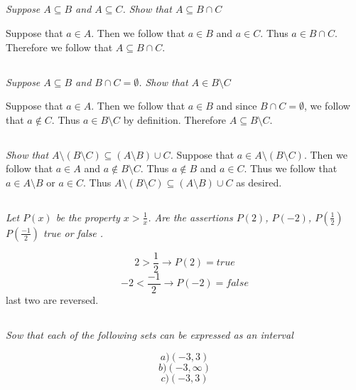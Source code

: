\documentclass[11pt,oneside,titlepage]{book}
\begin{document}
\subsection{}

\textit{Suppose $A \subseteq B$ and $A \subseteq C$. Show that $A \subseteq B \cap C$}

Suppose that $a \in A$. Then we follow that $a \in B$ and $a \in C$. Thus $a \in B \cap C$.
Therefore we follow that $A \subseteq B \cap C$.

\subsection{}

\textit{Suppose $A \subseteq B$ and $B \cap C = \emptyset$. Show that $A \in B \setminus C$}

Suppose that $a \in A$. Then we follow that $a \in B$ and since $B \cap C = \emptyset$, we
follow that $a \notin C$. Thus $a \in B \setminus C$ by definition. Therefore
$A \subseteq B \setminus C$.

\subsection{}

\textit{Show that $A \setminus (B \setminus C) \subseteq (A \setminus B) \cup C$.}
Suppose that $a \in A \setminus (B \setminus C)$. Then we follow that
$a \in A$ and $a \notin B \setminus C$. Thus $a \notin B$ and $a \in C$. Thus we
follow that $a \in A \setminus B$ or $a \in C$. Thus
$A \setminus (B \setminus C) \subseteq (A \setminus B) \cup C$
as desired.

\subsection{}

\textit{Let $P(x)$ be the property $x > \frac 1 x$. Are the assertions $P(2)$, $P(-2)$,
  $P(\frac 1 2)$ $P( \frac{-1}{2})$ true or false .}

$$2 > \frac 1 2 \to P(2) = true$$
$$-2 < \frac{-1}{2} \to P(-2) = false$$
last two are reversed.

\subsection{}

\textit{Sow that each of the following sets can be expressed as an interval}

$$a) (-3, 3)$$
$$b) (-3, \infty)$$
$$c) (-3, 3)$$
\end{document}
